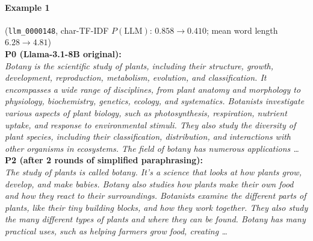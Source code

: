 
\paragraph{Example 1} (\texttt{llm_0000148}, char-TF-IDF $P(\mathrm{LLM})$: $\mathbf{0.858}\to\mathbf{0.410}$; mean word length $\mathbf{6.28}\to\mathbf{4.81}$)\\
\noindent\textbf{P0 (Llama-3.1-8B original):}\\
\emph{Botany is the scientific study of plants, including their structure, growth, development, reproduction, metabolism, evolution, and classification. It encompasses a wide range of disciplines, from plant anatomy and morphology to physiology, biochemistry, genetics, ecology, and systematics. Botanists investigate various aspects of plant biology, such as photosynthesis, respiration, nutrient uptake, and response to environmental stimuli. They also study the diversity of plant species, including their classification, distribution, and interactions with other organisms in ecosystems. The field of botany has numerous applications \ldots}\\[0.3em]
\noindent\textbf{P2 (after 2 rounds of simplified paraphrasing):}\\
\emph{The study of plants is called botany. It's a science that looks at how plants grow, develop, and make babies. Botany also studies how plants make their own food and how they react to their surroundings. Botanists examine the different parts of plants, like their tiny building blocks, and how they work together. They also study the many different types of plants and where they can be found. Botany has many practical uses, such as helping farmers grow food, creating \ldots}\\[0.7em]

